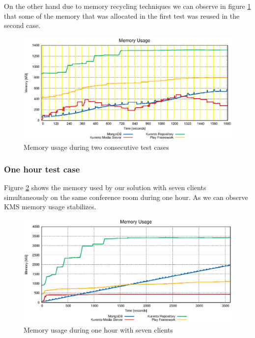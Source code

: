 On the other hand due to memory recycling techniques we can observe in figure \ref{fig:test_two_times_mem} that some of the memory that was allocated in the first test was reused in the second case.


\begin{figure}[!htb]
  \centering
  \includegraphics[width=\textwidth]{stats/test_two_times_mem.eps}
  \caption{Memory usage during two consecutive test cases}
  \label{fig:test_two_times_mem}
\end{figure}


\subsubsection{One hour test case}


   Figure \ref{fig:test_hour_mem} shows the memory used by our solution with seven clients simultaneously on the same conference room during one hour. As we can observe \ac{KMS} memory usage stabilizes.


\begin{figure}[!htb]
  \centering
  \includegraphics[width=\textwidth]{stats/test_hour_mem.eps}
  \caption{Memory usage during one hour with seven clients}
  \label{fig:test_hour_mem}
\end{figure}





